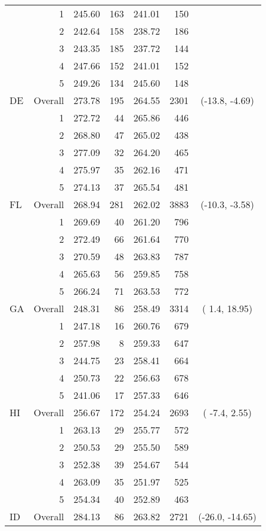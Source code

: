 \begin{longtable}{lrrr@{\extracolsep{.25cm}}rrc}
   & 1 & 245.60 & 163 & 241.01 & 150 &  \\ 
   & 2 & 242.64 & 158 & 238.72 & 186 &  \\ 
   & 3 & 243.35 & 185 & 237.72 & 144 &  \\ 
   & 4 & 247.66 & 152 & 241.01 & 152 &  \\ 
   & 5 & 249.26 & 134 & 245.60 & 148 &  \\ 
   \hline
DE & Overall & 273.78 & 195 & 264.55 & 2301 & (-13.8,  -4.69) \\ 
   & 1 & 272.72 &  44 & 265.86 & 446 &  \\ 
   & 2 & 268.80 &  47 & 265.02 & 438 &  \\ 
   & 3 & 277.09 &  32 & 264.20 & 465 &  \\ 
   & 4 & 275.97 &  35 & 262.16 & 471 &  \\ 
   & 5 & 274.13 &  37 & 265.54 & 481 &  \\ 
   \hline
FL & Overall & 268.94 & 281 & 262.02 & 3883 & (-10.3,  -3.58) \\ 
   & 1 & 269.69 &  40 & 261.20 & 796 &  \\ 
   & 2 & 272.49 &  66 & 261.64 & 770 &  \\ 
   & 3 & 270.59 &  48 & 263.83 & 787 &  \\ 
   & 4 & 265.63 &  56 & 259.85 & 758 &  \\ 
   & 5 & 266.24 &  71 & 263.53 & 772 &  \\ 
   \hline
GA & Overall & 248.31 &  86 & 258.49 & 3314 & (  1.4,  18.95) \\ 
   & 1 & 247.18 &  16 & 260.76 & 679 &  \\ 
   & 2 & 257.98 &   8 & 259.33 & 647 &  \\ 
   & 3 & 244.75 &  23 & 258.41 & 664 &  \\ 
   & 4 & 250.73 &  22 & 256.63 & 678 &  \\ 
   & 5 & 241.06 &  17 & 257.33 & 646 &  \\ 
   \hline
HI & Overall & 256.67 & 172 & 254.24 & 2693 & ( -7.4,   2.55) \\ 
   & 1 & 263.13 &  29 & 255.77 & 572 &  \\ 
   & 2 & 250.53 &  29 & 255.50 & 589 &  \\ 
   & 3 & 252.38 &  39 & 254.67 & 544 &  \\ 
   & 4 & 263.09 &  35 & 251.97 & 525 &  \\ 
   & 5 & 254.34 &  40 & 252.89 & 463 &  \\ 
   \hline
ID & Overall & 284.13 &  86 & 263.82 & 2721 & (-26.0, -14.65) \\ 

\end{longtable}
